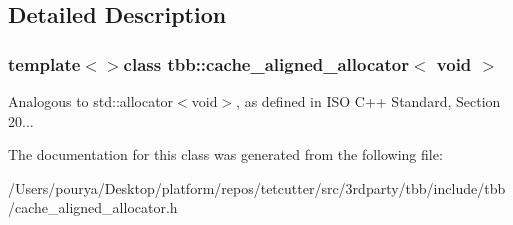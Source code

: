 \subsection{Detailed Description}
\subsubsection*{template$<$$>$class tbb\+::cache\+\_\+aligned\+\_\+allocator$<$ void $>$}

Analogous to std\+::allocator$<$void$>$, as defined in I\+S\+O C++ Standard, Section 20... 



The documentation for this class was generated from the following file\+:\begin{DoxyCompactItemize}
\item 
/\+Users/pourya/\+Desktop/platform/repos/tetcutter/src/3rdparty/tbb/include/tbb/cache\+\_\+aligned\+\_\+allocator.\+h\end{DoxyCompactItemize}
